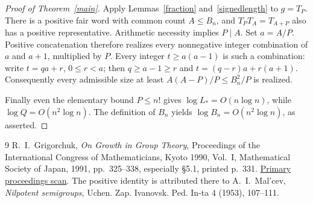 \documentclass[11pt]{article}
\begin{document}
\begin{proof}[Proof of Theorem~\ref{main}]
Apply Lemmas~\ref{fraction} and~\ref{signedlength} to $g=T_P$.
There is a positive fair word with common count $A\le B_n$, and
$T_PT_A=T_{A+P}$ also has a positive representative. Arithmetic
necessity implies $P\mid A$. Set $a=A/P$. Positive concatenation
therefore realizes every nonnegative integer combination of $a$ and
$a+1$, multiplied by $P$. Every integer $t\ge a(a-1)$ is such a
combination: write $t=qa+r$, $0\le r<a$; then $q\ge a-1\ge r$ and
$t=(q-r)a+r(a+1)$. Consequently every admissible size at least
$A(A-P)/P\le B_n^2/P$ is realized.

Finally even the elementary bound $P\le n!$ gives
$\log L_*=O(n\log n)$, while $\log Q=O(n^2\log n)$.
The definition of $B_n$ yields $\log B_n=O(n^2\log n)$, as asserted.
\end{proof}
\begin{thebibliography}{9}
 R.~I.~Grigorchuk,
\emph{On Growth in Group Theory}, Proceedings of the International
Congress of Mathematicians, Kyoto 1990, Vol.~I, Mathematical Society
of Japan, 1991, pp.~325--338, especially \S5.1, printed p.~331.
\href{https://www.mathunion.org/fileadmin/ICM/Proceedings/ICM1990.1/ICM1990.1.ocr.pdf}{Primary proceedings scan}.
The positive identity is attributed there to A.~I.~Mal'cev,
\emph{Nilpotent semigroups}, Uchen. Zap. Ivanovsk. Ped. In-ta
4 (1953), 107--111.
\end{thebibliography}
\end{document}
